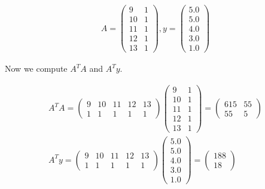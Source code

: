 \documentclass[a4paper]{article}
\begin{document}
\begin{align*}
    A = \begin{pmatrix}
        9 & 1\\
        10 & 1\\
        11 & 1\\
        12 & 1\\
        13 & 1
    \end{pmatrix},
    y = \begin{pmatrix}
        5.0\\
        5.0\\
        4.0\\
        3.0\\
        1.0
    \end{pmatrix}
\end{align*}

Now we compute $A^TA$ and $A^Ty$.

\begin{align*}
    A^TA = \begin{pmatrix}
        9 & 10 & 11 & 12 & 13\\
        1 & 1 & 1 & 1 & 1
    \end{pmatrix} \begin{pmatrix}
        9 & 1\\
        10 & 1\\
        11 & 1\\
        12 & 1\\
        13 & 1
    \end{pmatrix} = \begin{pmatrix}
        615 & 55\\
        55 & 5
    \end{pmatrix}\\
    A^Ty = \begin{pmatrix}
        9 & 10 & 11 & 12 & 13\\
        1 & 1 & 1 & 1 & 1
    \end{pmatrix} \begin{pmatrix}
        5.0\\
        5.0\\
        4.0\\
        3.0\\
        1.0
    \end{pmatrix} = \begin{pmatrix}
        188\\
        18
    \end{pmatrix}
\end{align*}
\end{document}
